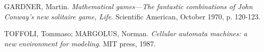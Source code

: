 \begin{thebibliography}{9}

  GARDNER, Martin. \textit{Mathematical games—The fantastic combinations of John Conway’s new solitaire game, Life}. Scientific American, October 1970, p. 120-123.

  TOFFOLI, Tommaso; MARGOLUS, Norman. \textit{Cellular automata machines: a new environment for modeling}. MIT press, 1987.

\end{thebibliography}
